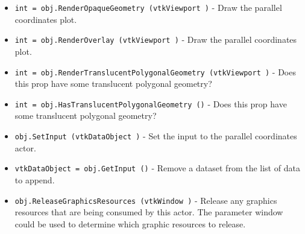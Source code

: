 \begin{itemize}
\item  \verb|int = obj.RenderOpaqueGeometry (vtkViewport )| -  Draw the parallel coordinates plot.

\item  \verb|int = obj.RenderOverlay (vtkViewport )| -  Draw the parallel coordinates plot.

\item  \verb|int = obj.RenderTranslucentPolygonalGeometry (vtkViewport )| -  Does this prop have some translucent polygonal geometry?

\item  \verb|int = obj.HasTranslucentPolygonalGeometry ()| -  Does this prop have some translucent polygonal geometry?

\item  \verb|obj.SetInput (vtkDataObject )| -  Set the input to the parallel coordinates actor.

\item  \verb|vtkDataObject = obj.GetInput ()| -  Remove a dataset from the list of data to append.

\item  \verb|obj.ReleaseGraphicsResources (vtkWindow )| -  Release any graphics resources that are being consumed by this actor.
 The parameter window could be used to determine which graphic
 resources to release.

\end{itemize}
